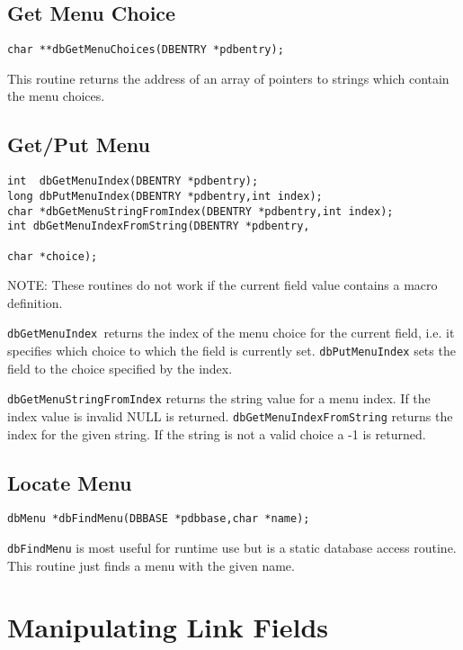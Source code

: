 \subsection{Get Menu Choice}

\begin{verbatim}char **dbGetMenuChoices(DBENTRY *pdbentry);
\end{verbatim}This routine returns the address of an array of pointers to strings which contain the menu choices.

\subsection{Get/Put Menu}

\begin{verbatim}int  dbGetMenuIndex(DBENTRY *pdbentry);
long dbPutMenuIndex(DBENTRY *pdbentry,int index);
char *dbGetMenuStringFromIndex(DBENTRY *pdbentry,int index);
int dbGetMenuIndexFromString(DBENTRY *pdbentry,

char *choice);
\end{verbatim}
NOTE: These routines do not work if the current field value contains a macro definition.

\verb|dbGetMenuIndex |returns the index of the menu choice for the current field, i.e. it specifies which choice to which the 
field is currently set. \verb|dbPutMenuIndex| sets the field to the choice specified by the index.

\verb|dbGetMenuStringFromIndex| returns the string value for a menu index. If the index value is invalid NULL is 
returned. \verb|dbGetMenuIndexFromString| returns the index for the given string. If the string is not a valid choice a -1 
is returned.

\subsection{Locate Menu}

\begin{verbatim}dbMenu *dbFindMenu(DBBASE *pdbbase,char *name);
\end{verbatim}\verb|dbFindMenu| is most useful for runtime use but is a static database access routine. This routine just finds a menu with the 
given name.

\section{Manipulating Link Fields}

